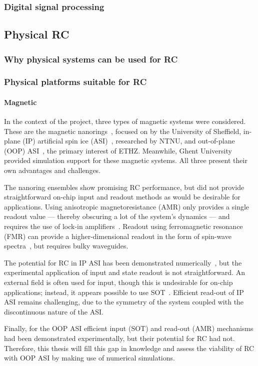 \subsubsection{Digital signal processing} %
\subsection{Physical RC}
\subsubsection{Why physical systems can be used for RC}
\subsubsection{Physical platforms suitable for RC}
\paragraph{Magnetic} %
In the context of the \spinengine project, three types of magnetic systems were considered.
These are the magnetic nanorings~\cite{DynamicEmergence_NanomagneticSystem}, focused on by the University of Sheffield, in-plane (IP) artificial spin ice (ASI)~\cite{RC_ASI}, researched by NTNU, and out-of-plane (OOP) ASI~\cite{KUR-24}, the primary interest of ETHZ.
Meanwhile, Ghent University provided simulation support for these magnetic systems.
All three present their own advantages and challenges. \par
The nanoring ensembles show promising RC performance, but did not provide straightforward on-chip input and readout methods as would be desirable for applications.
Using anisotropic magnetoresistance (AMR) only provides a single readout value --- thereby obscuring a lot of the system's dynamics --- and requires the use of lock-in amplifiers~\cite{ArchitecturesNanoringRC,Vidamour2023}.
Readout using ferromagnetic resonance (FMR) can provide a higher-dimensional readout in the form of spin-wave spectra~\cite{swindells2024fingerprinting}, but requires bulky waveguides. \par
The potential for RC in IP ASI has been demonstrated numerically~\cite{RC_ASI}, but the experimental application of input and state readout is not straightforward.
An external field is often used for input, though this is undesirable for on-chip applications; instead, it appears possible to use SOT~\cite{SOT_switching_IP}.
Efficient read-out of IP ASI remains challenging, due to the symmetry of the system coupled with the discontinuous nature of the ASI. \par %
Finally, for the OOP ASI efficient input (SOT) and read-out (AMR) mechanisms had been demonstrated experimentally, but their potential for RC had not.
Therefore, this thesis will fill this gap in knowledge and assess the viability of RC with OOP ASI by making use of numerical simulations.
